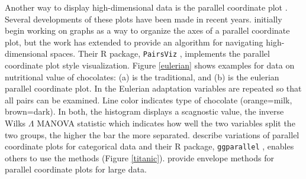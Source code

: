 \documentclass[11pt]{article}
\begin{document}
\begin{itemize}
Another way to display high-dimensional data is the parallel coordinate plot \citep{In85,We90}. Several developments of these plots have been made in recent years. \citet{hurley.oldford} initially begin working on graphs as a way to organize the axes of a parallel coordinate plot, but the work has extended to provide an algorithm for navigating high-dimensional spaces. Their R package, {\tt PairsViz} \citep{pairviz}, implements the parallel coordinate plot style visualization. Figure \ref{eulerian} shows examples for data on nutritional value of chocolates: (a) is the traditional, and (b) is the eulerian parallel coordinate plot. In the Eulerian adaptation variables are repeated so that all pairs can be examined. Line color indicates type of chocolate (orange=milk, brown=dark). In both, the histogram displays a scagnostic value, the inverse Wilks $\Lambda$ MANOVA statistic which indicates how well the two variables split the two groups, the higher the bar the more separated.  \citet{hofmann.vendettuoli} describe variations of parallel coordinate plots for categorical data and their R package, {\tt ggparallel} \citep{ggparallel}, enables others to use the methods (Figure \ref{titanic}). \citet{envelope} provide envelope methods for parallel coordinate plots for large data.


\end{itemize}
\end{document}
